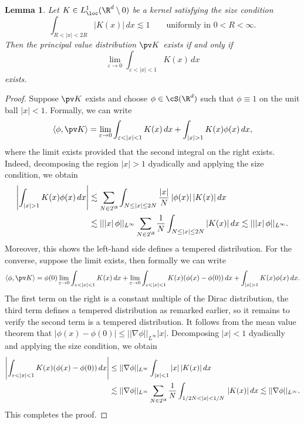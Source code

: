 \documentclass[reqno]{amsart}
\newtheorem{lemma}[theorem]{Lemma}
\theoremstyle{definition}
\theoremstyle{remark}
\renewcommand{\epsilon}{\varepsilon}
\begin{document}
\begin{lemma}
	Let $K \in L^1_{\loc} (\R^d \setminus 0)$ be a kernel satisfying the size condition 
		\[ \int_{R < |x| < 2R} |K(x)| \, dx \lesssim 1 \qquad \text{uniformly in $0 < R < \infty$}. \]
	Then the principal value distribution $\pv K$ exists if and only if 
		\[ \lim_{\epsilon \to 0} \int_{\epsilon < |x| < 1} K(x) \, dx \]
	exists. 	\label{lem:pv}
\end{lemma}	

\begin{proof}
	Suppose $\pv K$ exists and choose $\phi \in \cS (\R^d)$ such that $\phi \equiv 1$ on the unit ball $|x| < 1$. Formally, we can write
		\[ \langle \phi, \pv K \rangle =  \lim_{\epsilon \to 0}\int_{\epsilon < |x| < 1} K(x) \, dx + \int_{|x| > 1} K(x) \phi(x) \, dx, \]
	where the limit exists provided that the second integral on the right exists. Indeed, decomposing the region $|x| > 1$ dyadically and applying the size condition, we obtain 
		\begin{align*}
			  \left|\int_{|x| > 1} K(x) \phi(x) \, dx\right| 
			  		&\lesssim \sum_{N \in 2^\N} \int_{N \leq |x| \leq 2N} \frac{|x|}{N} \, |\phi(x)| \, |K(x)| \, dx \\
			  		&\lesssim || |x| \, \phi||_{L^\infty} \sum_{N \in 2^\N} \frac1N \int_{N \leq |x| \leq 2N} |K(x)| \,dx \lesssim || |x| \, \phi||_{L^\infty} .
			 \end{align*}
		Moreover, this shows the left-hand side defines a tempered distribution. For the converse, suppose the limit exists, then formally we can write
			\[ \langle \phi, \pv K \rangle = \phi(0) \lim_{\epsilon \to 0} \int_{\epsilon < |x| < 1} K(x) \, dx + \lim_{\epsilon \to 0} \int_{\epsilon < |x| < 1} K(x) (\phi(x) - \phi(0)) \, dx + \int_{|x| > 1} K(x)  \phi(x) \, dx. \]
		The first term on the right is a constant multiple of the Dirac distribution, the third term defines a tempered distribution as remarked earlier, so it remains to verify the second term is a tempered distribution. It follows from the mean value theorem that $|\phi(x) - \phi(0)| \leq ||\nabla \phi||_{L^\infty} |x|$. Decomposing $|x| < 1$ dyadically and applying the size condition, we obtain 
			\begin{align*}
			 	\left|\int_{\epsilon < |x| < 1} K(x) (\phi(x) - \phi(0)) \, dx\right|
			 		& \leq || \nabla \phi ||_{L^\infty} \int_{|x| < 1} |x| \, |K(x)| \, dx  \\
			 		&\lesssim  || \nabla \phi ||_{L^\infty} \sum_{N \in 2^\N} \frac1N \int_{1/2N< |x| < 1/N}  \, |K(x)| \, dx \lesssim || \nabla \phi ||_{L^\infty}.
			 \end{align*}	
	This completes the proof. 		 
\end{proof}
\end{document}
